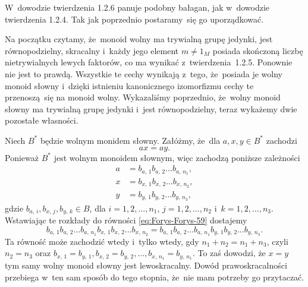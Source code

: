 \documentclass[a4paper,11pt]{article}
\begin{document}
\vspace{\spaceFour}





\start {} W~dowodzie twierdzenia 1.2.6 panuje podobny bałagan,
jak w~dowodzie twierdzenia 1.2.4. Tak jak poprzednio postaramy~się go
uporządkować.

Na początku czytamy, że~monoid wolny ma trywialną grupę jedynki, jest
równopodzielny, skracalny i~każdy jego element $m \neq 1_{ M }$
posiada skończoną liczbę nietrywialnych lewych faktorów, co ma wynikać
z~twierdzenia~1.2.5. Ponownie nie jest to prawdą. Wszystkie te cechy
wynikają z~tego, że~posiada je wolny monoid słowny i~dzięki istnieniu
kanonicznego izomorfizmu cechy te przenoszą~się na monoid wolny.
Wykazaliśmy poprzednio, że~wolny monoid słowny ma trywialną grupę
jedynki i~jest równopodzielny, teraz wykażemy dwie pozostałe
własności.

Niech $B^{ * }$ będzie wolnym monidem słowny. Załóżmy, że~dla
$a, x, y \in B^{ * }$ zachodzi
\begin{equation}
  \label{eq:Forys-Forys-59}
  a x = a y.
\end{equation}
Ponieważ $B^{ * }$ jest wolnym monoidem słownym, więc zachodzą
poniższe zależności
\begin{subequations}
  \begin{align}
    \label{eq:Forys-Forys-60-A}
    a &= b_{ a,\, 1 } b_{ a,\, 2 } \ldots b_{ a,\, n_{ 1 } }, \\
    \label{eq:Forys-Forys-60-B}
    x &= b_{ x,\, 1 } b_{ x,\, 2 } \ldots b_{ x,\, n_{ 2 } }, \\
    \label{eq:Forys-Forys-60-C}
    y &= b_{ y,\, 1 } b_{ y,\, 2 } \ldots b_{ y,\, n_{ 3 } },
  \end{align}
\end{subequations}
gdzie $b_{ a,\, i }, b_{ x,\, j }, b_{ y,\, k } \in B$, dla
$i = 1, 2, \ldots, n_{ 1 }$, $j = 1, 2, \ldots, n_{ 2 }$
i~$k = 1, 2, \ldots, n_{ 3 }$. Wstawiając te rozkłady do równości
\eqref{eq:Forys-Forys-59} dostajemy
\begin{equation}
  \label{eq:Forys-Forys-61}
  b_{ a,\, 1 } b_{ a,\, 2 } \ldots b_{ a,\, n_{ 1 } } b_{ x,\, 1 }
  b_{ x,\, 2 } \ldots b_{ x,\, n_{ 2 } }
  =
  b_{ a,\, 1 } b_{ a,\, 2 } \ldots b_{ a,\, n_{ 1 } } b_{ y,\, 1 }
  b_{ y,\, 2 } \ldots b_{ y,\, n_{ 3 } }.
\end{equation}
Ta równość może zachodzić wtedy i~tylko wtedy, gdy
$n_{ 1 } + n_{ 2 } = n_{ 1 } + n_{ 3 }$, czyli $n_{ 2 } = n_{ 3 }$
oraz
$b_{ x,\, 1 } = b_{ y,\, 1 }, b_{ x,\, 2 } = b_{ y,\, 2 }, \ldots, b_{ x,\,
  n_{ 1 } } = b_{ y,\, n_{ 1 } }$. To zaś dowodzi, że $x = y$ tym samy
wolny monoid słowny jest lewoskracalny. Dowód prawoskracalności
przebiega w~ten sam sposób do tego stopnia, że~nie mam potrzeby go
przytaczać.
\end{document}
